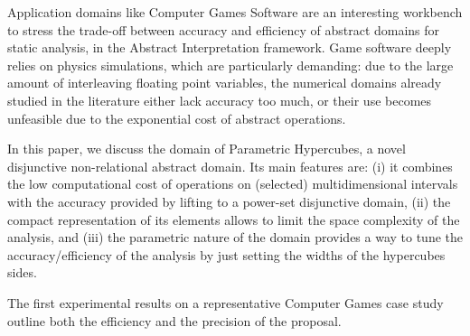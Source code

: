 Application domains like Computer Games Software are an interesting workbench to stress the trade-off between accuracy and efficiency of abstract domains for static analysis, in the Abstract Interpretation framework. Game software deeply relies on physics simulations, which are particularly demanding: due to the large amount of interleaving floating point variables, the numerical domains already studied in the literature either lack accuracy too much, or their use becomes unfeasible due to the exponential cost of abstract operations.

In this paper, we discuss the domain of Parametric Hypercubes, a novel disjunctive non-relational abstract domain. Its main features are: (i) it combines the low computational cost of operations on (selected) multidimensional intervals with the accuracy provided by lifting to a power-set disjunctive domain, (ii) the compact representation of its elements allows to limit the space complexity of the analysis, and (iii) the parametric nature of the domain provides a way to tune the accuracy/efficiency of the analysis by just setting the widths of the hypercubes sides.

The first experimental results on a representative Computer Games case study outline both the efficiency and the precision of the proposal.

